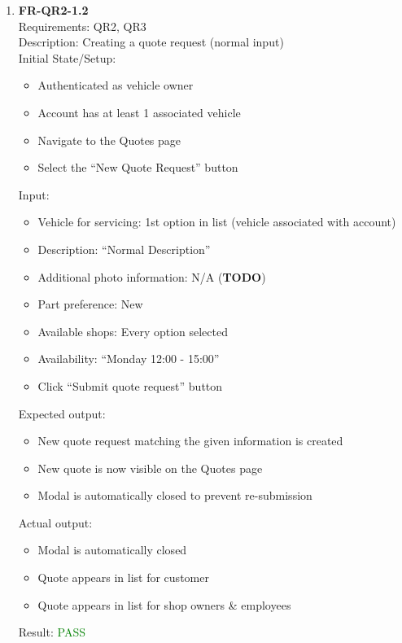 \documentclass[12pt, titlepage]{article}
\newcommand{\testpass}{\textcolor{green}{PASS}}
\begin{document}
\begin{enumerate}
                \item \textbf{FR-QR2-1.2} \label{FR-QR2-1.2} \\ Requirements: QR2, QR3 \\
                    Description: Creating a quote request (normal input) \\
                    Initial State/Setup: \begin{itemize}
                        \item Authenticated as vehicle owner
                        \item Account has at least 1 associated vehicle
                        \item Navigate to the Quotes page
                        \item Select the ``New Quote Request'' button
                    \end{itemize}
                    Input: \begin{itemize}
                        \item Vehicle for servicing: 1st option in list (vehicle associated with account)
                        \item Description: ``Normal Description''
                        \item Additional photo information: N/A (\textbf{TODO})
                        \item Part preference: New
                        \item Available shops: Every option selected
                        \item Availability: ``Monday 12:00 - 15:00''
                        \item Click ``Submit quote request'' button
                    \end{itemize}
                    Expected output: \begin{itemize}
                        \item New quote request matching the given information is created
                        \item New quote is now visible on the Quotes page
                        \item Modal is automatically closed to prevent re-submission
                    \end{itemize}
                    Actual output: \begin{itemize}
                        \item Modal is automatically closed
                        \item Quote appears in list for customer
                        \item Quote appears in list for shop owners \& employees
                    \end{itemize}
                    Result: \testpass


\end{enumerate}
\end{document}
